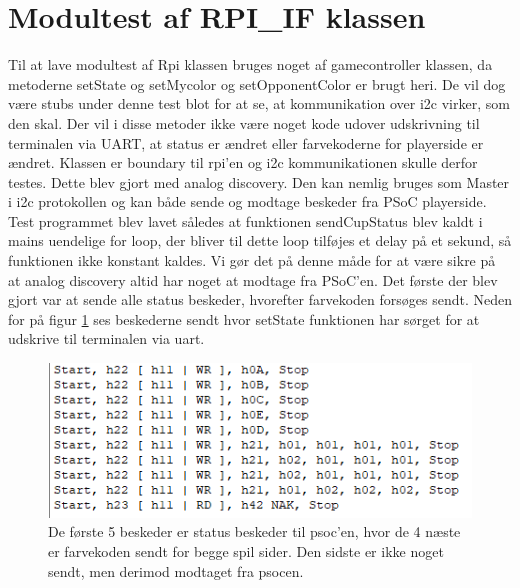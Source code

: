 \documentclass[Modultest/Modultest_main.tex]{subfiles}
\begin{document}
\section{Modultest af RPI\_IF klassen}
Til at lave modultest af Rpi klassen bruges noget af gamecontroller klassen, da metoderne setState og setMycolor og setOpponentColor er brugt heri. De vil dog være stubs under denne test blot for at se, at kommunikation over i2c virker, som den skal. Der vil i disse metoder ikke være noget kode udover udskrivning til terminalen via UART, at status er ændret eller farvekoderne for playerside er ændret. 
Klassen er boundary til rpi'en og i2c kommunikationen skulle derfor testes. Dette blev gjort med analog discovery. Den kan nemlig bruges som Master i i2c protokollen og kan både sende og modtage beskeder fra PSoC playerside. Test programmet blev lavet således at funktionen sendCupStatus blev kaldt i mains uendelige for loop, der bliver til dette loop tilføjes et delay på et sekund, så funktionen ikke konstant kaldes. Vi gør det på denne måde for at være sikre på at analog discovery altid har noget at modtage fra PSoC'en. Det første der blev gjort var at sende alle status beskeder, hvorefter farvekoden forsøges sendt. Neden for på figur \ref{fig:analog_beskeder} ses beskederne sendt hvor setState funktionen har sørget for at udskrive til terminalen via uart.
\begin{figure}
    \centering 
    \includegraphics[width=\linewidth]{Modultest/RPI_IF/graphic/analog_beskeder.PNG}
    \caption{De første 5 beskeder er status beskeder til psoc'en, hvor de 4 næste er farvekoden sendt for begge spil sider. Den sidste er ikke noget sendt, men derimod modtaget fra psocen.}
    \label{fig:analog_beskeder}
\end{figure}
\end{document}
